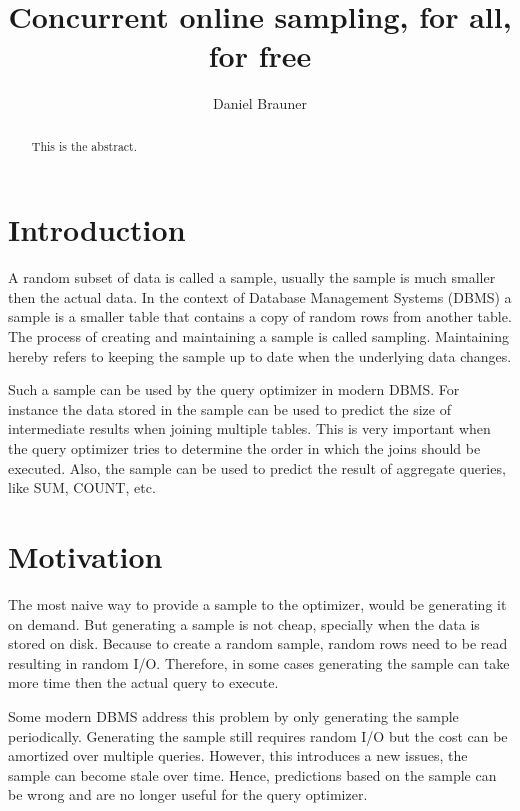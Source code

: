 \documentclass[sigconf,nonacm]{acmart}
\begin{document}
    \title{Concurrent online sampling, for all, for free}

    \author{Daniel Brauner}
    
    \begin{abstract}
        This is the abstract.
    \end{abstract}


    \maketitle

    \section{Introduction}
        A random subset of data is called a sample, usually the sample is much smaller then the actual data. In the context of Database Management Systems (DBMS) a sample is a smaller table that contains a copy of random rows from another table. The process of creating and maintaining a sample is called sampling. Maintaining hereby refers to keeping the sample up to date when the underlying data changes.
    
        Such a sample can be used by the query optimizer in modern DBMS. For instance the data stored in the sample can be used to predict the size of intermediate results when joining multiple tables. This is very important when the query optimizer tries to determine the order in which the joins should be executed. Also, the sample can be used to predict the result of aggregate queries, like SUM, COUNT, etc. 


    \section{Motivation} 
        The most naive way to provide a sample to the optimizer, would be generating it on demand. But generating a sample is not cheap, specially when the data is stored on disk. Because to create a random sample, random rows need to be read resulting in random I/O. Therefore, in some cases generating the sample can take more time then the actual query to execute.

        Some modern DBMS address this problem by only generating the sample periodically. Generating the sample still requires random I/O but the cost can be amortized over multiple queries. However, this introduces a new issues, the sample can become stale over time. Hence, predictions based on the sample can be wrong and are no longer useful for the query optimizer.
\end{document}
